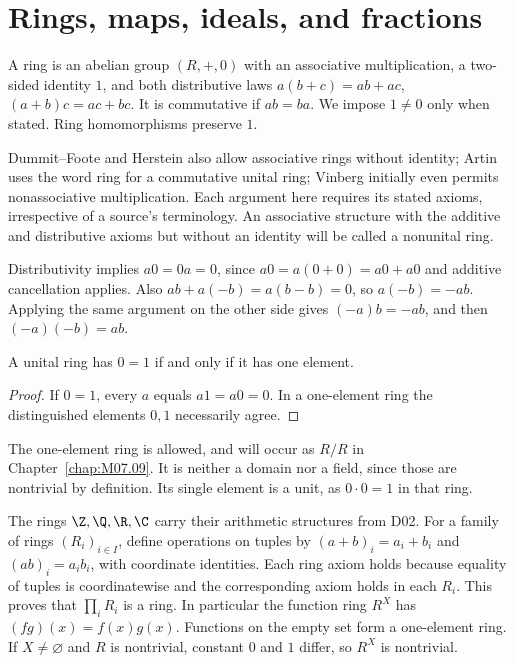 \chapter{Rings, maps, ideals, and fractions}\label{chap:M07.08}

\begin{definition}
A ring is an abelian group $(R,+,0)$ with an associative multiplication,
a two-sided identity $1$, and both distributive laws
$a(b+c)=ab+ac$, $(a+b)c=ac+bc$. It is commutative if $ab=ba$.
We impose $1\ne0$ only when stated. Ring homomorphisms preserve $1$.
\end{definition}
Dummit--Foote and Herstein also allow associative rings without identity;
Artin uses the word ring for a commutative unital ring; Vinberg initially
even permits nonassociative multiplication. Each argument here requires
its stated axioms, irrespective of a source's terminology. An associative
structure with the additive and distributive axioms but without an identity
will be called a nonunital ring.

Distributivity implies $a0=0a=0$, since $a0=a(0+0)=a0+a0$
and additive cancellation applies. Also
$ab+a(-b)=a(b-b)=0$, so $a(-b)=-ab$. Applying the same argument on
the other side gives $(-a)b=-ab$, and then $(-a)(-b)=ab$.

\begin{proposition}\label{prop:zero-ring}
A unital ring has $0=1$ if and only if it has one element.
\end{proposition}
\begin{proof}
If $0=1$, every $a$ equals $a1=a0=0$. In a one-element ring the
distinguished elements $0,1$ necessarily agree.
\end{proof}
The one-element ring is allowed, and will occur as $R/R$ in
Chapter~\ref{chap:M07.09}. It is neither a domain nor a field, since those
are nontrivial by definition. Its single element is a unit, as
$0\cdot0=1$ in that ring.

The rings $\Z,\Q,\R,\C$ carry their arithmetic structures from D02.
For a family of rings $(R_i)_{i\in I}$, define operations on tuples by
$(a+b)_i=a_i+b_i$ and $(ab)_i=a_i b_i$, with coordinate identities.
Each ring axiom holds because equality of tuples is coordinatewise and
the corresponding axiom holds in each $R_i$. This proves that
$\prod_iR_i$ is a ring. In particular the function ring $R^X$ has
$(fg)(x)=f(x)g(x)$. Functions on the empty set form a one-element ring.
If $X\ne\varnothing$ and $R$ is nontrivial, constant $0$ and $1$ differ,
so $R^X$ is nontrivial.

